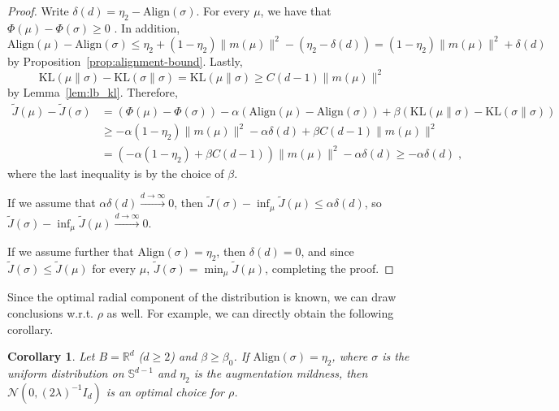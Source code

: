 \documentclass{article}
\newtheorem{corollary}{Corollary}
\newcommand{\KL}{\mathrm{KL}}
\newcommand{\R}{\mathbb{R}}
\newcommand{\Sph}{\mathbb{S}}
\newcommand{\ignore}[1]{}
\begin{document}
\begin{proof}   
Write $\delta(d) = \eta_2 - \mathrm{Align}(\sigma)$. For every $\mu$, we have that $\Phi(\mu)-\Phi(\sigma)\geq 0$ \citep[Theorem~1]{wang2020understanding}. In addition, 
\begin{equation}
    \mathrm{Align}(\mu)-\mathrm{Align}(\sigma)\leq \eta_2 + (1-\eta_2)\|m(\mu)\|^2 - (\eta_2-\delta(d))=(1-\eta_2)\|m(\mu)\|^2 +\delta(d)
\end{equation}
by Proposition~\ref{prop:alignment-bound}. Lastly,
\begin{equation}
    \KL(\mu\|\sigma)-\KL(\sigma\|\sigma)=\KL(\mu\|\sigma)\geq C(d-1)\|m(\mu)\|^2
\end{equation}
by Lemma~\ref{lem:lb_kl}. Therefore,
\begin{align}\nonumber
\tilde{J}(\mu)-\tilde{J}(\sigma)
&= \left(\Phi(\mu)-\Phi(\sigma)\right) -\alpha(\mathrm{Align}(\mu)-\mathrm{Align}(\sigma))+\beta(\KL(\mu\|\sigma)-\KL(\sigma\|\sigma))\\\nonumber
&\geq -\alpha(1-\eta_2)\|m(\mu)\|^2-\alpha\delta(d)+\beta C(d-1)\|m(\mu)\|^2\\
&= \left(-\alpha(1-\eta_2)+\beta C(d-1)\right)\|m(\mu)\|^2-\alpha\delta(d)\geq -\alpha\delta(d)\;,
\end{align}
where the last inequality is by the choice of $\beta$. 



If we assume that $\alpha\delta(d)\xrightarrow{d\to\infty} 0$, then $\tilde{J}(\sigma)-\inf_\mu\tilde{J}(\mu)\leq \alpha\delta(d)$, so $\tilde{J}(\sigma)- \inf_\mu\tilde{J}(\mu)\xrightarrow{d\to\infty} 0$.

If we assume further that $\mathrm{Align}(\sigma)=\eta_2$, then $\delta(d)=0$, and since $\tilde{J}(\sigma)\leq \tilde{J}(\mu)$ for every $\mu$, $\tilde{J}(\sigma)=\min_{\mu} \tilde{J}(\mu)$, completing the proof. 
\end{proof}
Since the optimal radial component of the distribution is known, we can draw conclusions w.r.t. $\rho$ as well. For example, we can directly obtain the following corollary. 
\begin{corollary}\label{cor:unnormalized is gaussian}
Let $B=\R^d$ ($d\geq 2$) and $\beta\geq\beta_0$. If $\mathrm{Align}(\sigma)=\eta_2$, where $\sigma$ is the uniform distribution on $\Sph^{d-1}$ and $\eta_2$ is the augmentation mildness, then $\mathcal{N}(0,(2\lambda)^{-1}I_d)$ is an optimal choice for $\rho$.
\end{corollary}

\ignore{%
}
\ignore{

}
\end{document}

